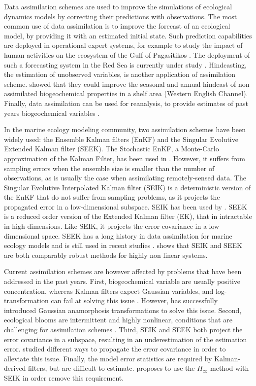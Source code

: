 Data assimilation schemes are used to improve the simulations of ecological dynamics models by correcting their predictions with observations. The most common use of data assimilation is to improve the forecast of an ecological model, by providing it with an estimated initial state. Such prediction capabilities are deployed in operational expert systems, for example to study the impact of human activities on the ecosystem of the Gulf of Pagasitikos \cite{Korres2012}. The deployment of such a forecasting system in the Red Sea is currently under study \cite{Triantafyllou2014}. Hindcasting, the estimation of unobserved variables, is another application of assimilation scheme. \cite{Ciavatta2011}  showed that they could improve the seasonal and annual hindcast of non assimilated biogeochemical properties in a shelf area (Western English Channel). Finally, data assimilation can be used for reanalysis, to provide estimates of past years biogeochemical variables \cite{Fontana2013}. 

In the marine ecology modeling community, two assimilation schemes have been widely used: the Ensemble Kalman filters (EnKF) and the Singular Evolutive Extended Kalman filter (SEEK). The Stochastic EnKF, a Monte-Carlo approximation of the Kalman Filter, has been used in \cite{Ciavatta2011, Ciavatta2014}. However, it suffers from sampling errors when the ensemble size is smaller than the number of observations, as is usually the case when assimilating remotely-sensed data. The Singular Evolutive Interpolated Kalman filter (SEIK) is a deterministic version of the EnKF that do not suffer from sampling problems, as it projects the propagated error in a low-dimensional subspace. SEIK has been used by \cite{Triantafyllou2012, Korres2012}. SEEK is a reduced order version of the Extended Kalman filter (EK), that in intractable in high-dimensions. Like SEIK, it projects the error covariance in a low dimensional space. SEEK has a long history in data assimilation for marine ecology models and is still used in recent studies \cite{Fontana2013, Korres2012, Butenschon2012}. \cite{Korres2012} shows that SEIK and SEEK are both comparably robust methods for highly non linear systems.

Current assimilation schemes are however affected by problems that have been addressed in the past years. First, biogeochemical variable are usually positive concentration, whereas Kalman filters expect Gaussian variables, and log-transformation can fail at solving this issue \cite{Ciavatta2011}. However, \cite{Fontana2013} has successfully introduced Gaussian anamorphosis transformations to solve this issue. Second, ecological blooms are intermittent and highly nonlinear, conditions that are challenging for assimilation schemes \cite{Triantafyllou2012, Korres2012}. Third, SEIK and SEEK both project the error covariance in a subspace, resulting in an underestimation of the estimation error. \cite{Butenschon2012} studied different ways to propagate the error covariance in order to alleviate this issue. Finally, the model error statistics are required by Kalman-derived filters, but are difficult to estimate. \cite{Triantafyllou2012} proposes to use the $H_\infty$ method with SEIK in order remove this requirement.

